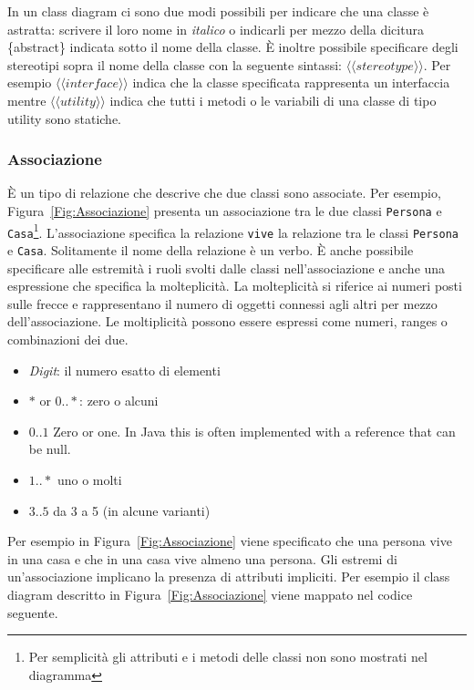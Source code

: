 \documentclass{article}
\begin{document}
In un class diagram ci sono due modi possibili per indicare che una classe \`e astratta: scrivere il loro nome in \textit{italico} o indicarli per mezzo della dicitura   \{abstract\} indicata sotto il nome della classe.
\`E inoltre possibile specificare degli stereotipi sopra il nome della classe con la seguente sintassi: $\langle \langle stereotype \rangle \rangle$. Per esempio $\langle \langle interface \rangle \rangle$ indica che la classe specificata rappresenta un interfaccia mentre 
$\langle \langle utility \rangle \rangle$ indica che tutti i metodi o le variabili di una classe di tipo utility sono statiche.

\subsubsection{Associazione} 
\`E un tipo di relazione che descrive che due classi sono associate. Per esempio, Figura~\ref{Fig:Associazione} presenta un associazione tra le due classi \texttt{Persona} e \texttt{Casa}\footnote{Per semplicit\`a gli attributi e i metodi delle classi non sono mostrati nel diagramma}. 
L'associazione specifica la relazione \texttt{vive} la relazione tra le classi  \texttt{Persona} e \texttt{Casa}.  Solitamente il nome della relazione \`e un verbo. \`E anche possibile specificare alle estremit\`a i ruoli svolti dalle classi nell'associazione e anche una espressione che specifica la molteplicit\`a. La molteplicit\`a si riferice ai numeri posti sulle frecce e rappresentano il numero di oggetti connessi agli altri per mezzo dell'associazione. Le moltiplicit\`a possono essere espressi come numeri, ranges o combinazioni dei due.
\begin{itemize}
\item \textit{Digit}: il numero esatto di elementi
\item $*$ or $0..*$: zero o alcuni
\item $0..1$ Zero or one. In Java this is often implemented with a reference that can be null.
\item $1..*$ uno o molti
\item $3..5$ da 3 a 5 (in alcune varianti)
\end{itemize}
Per esempio in Figura~\ref{Fig:Associazione} viene specificato che una persona vive in una casa e che in una casa vive almeno una persona.
Gli estremi di un'associazione implicano la presenza di attributi impliciti. Per esempio il class diagram descritto in Figura~\ref{Fig:Associazione} viene mappato nel codice seguente.
\end{document}
